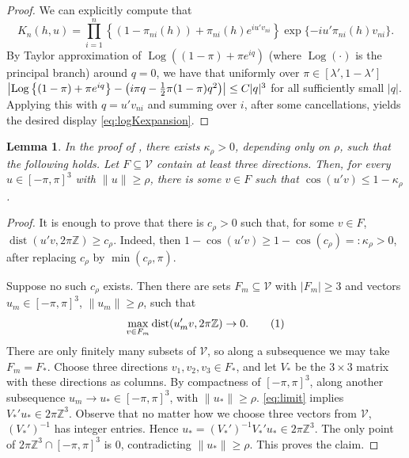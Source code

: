 \documentclass[12pt,reqno]{amsart}
\theoremstyle{theorem}
\newtheorem{lem}{Lemma}[section]
\theoremstyle{definition}
\newcommand\numberthis{\addtocounter{equation}{1}\tag{\theequation}}
\newcommand{\0}{\mathbf{0}}
\newcommand{\1}{\mathbf{1}}
\DeclareMathOperator{\dist}{dist} %
\DeclareMathOperator{\Log}{Log} %
\begin{document}
\begin{proof}
We can explicitly compute that
\[
K_n(h,u)
=
\prod_{i=1}^n
\left\{(1-\pi_{ni}(h))+\pi_{ni}(h)e^{iu'v_{ni}}\right\}
\exp\{-iu'\pi_{ni}(h)v_{ni}\}.
\]
	By Taylor approximation of $\Log((1-\pi) + \pi e^{i q})$ (where $\Log(\cdot)$ is the
	principal branch) around $q = 0$, we have that uniformly over $\pi \in [\lambda',
	1-\lambda']$
	\(
		\abs[\big]{
			\Log\br{(1-\pi) + \pi e^{iq}} - \pr{i\pi q - \frac{1}{2} \pi(1-\pi) q^2
		}}\le C |q|^3
	\)
	for all sufficiently small $|q|$.
	Applying this with $q = u'v_{ni}$ and summing over $i$, after some cancellations,
	yields the desired display
	\eqref{eq:logKexpansion}.
\end{proof}

\begin{lem}\label{lem:frequent-separated}
In the proof of ,  there exists \(\kappa_\rho>0\), depending only on \(\rho\), such
that the following holds.  Let \(F\subseteq\mathcal V\) contain at least three
directions.  Then, for every \(u\in[-\pi,\pi]^3\) with \(\|u\|\ge\rho\), there is
some \(v\in F\) such that \(\cos(u'v)\le 1-\kappa_\rho\).
\end{lem}

\begin{proof}
It is enough to prove that there is \(c_\rho>0\) such that, for some \(v\in F\),
\(
\dist(u'v,2\pi\mathbb Z)\ge c_\rho.
\)
Indeed, then \(1-\cos(u'v)\ge 1-\cos(c_\rho)=:\kappa_\rho>0\), after replacing
\(c_\rho\) by \(\min(c_\rho,\pi)\).

Suppose no such \(c_\rho\) exists.  Then there are sets \(F_m\subseteq\mathcal V\)
with \(|F_m|\ge3\) and vectors \(u_m\in[-\pi,\pi]^3\), \(\|u_m\|\ge\rho\), such
that
\[
\max_{v\in F_m}\dist(u_m'v,2\pi\mathbb Z)\to0. \numberthis \label{eq:limit}
\]
There are only finitely many subsets of \(\mathcal V\), so along a subsequence
we may take \(F_m=F_*\).  Choose three directions \(v_1,v_2,v_3\in F_*\), and
let \(V_*\) be the \(3\times3\) matrix with these directions as columns.  By
compactness of $[-\pi, \pi]^3$, along another subsequence \(u_m\to u_*\in[-\pi,\pi]^3\),
with
\(\|u_*\|\ge\rho\). \eqref{eq:limit} implies
\(
V_*'u_*\in 2\pi\mathbb Z^3.
\)
Observe that no matter how we choose three vectors from $\mathcal V$,
\((V_*')^{-1}\) has integer entries.  Hence
\(
u_*=(V_*')^{-1}V_*'u_*\in2\pi\mathbb Z^3.
\)
The only point of \(2\pi\mathbb Z^3\cap[-\pi,\pi]^3\) is \(0\), contradicting
\(\|u_*\|\ge\rho\).  This proves the claim.
\end{proof}
\end{document}
